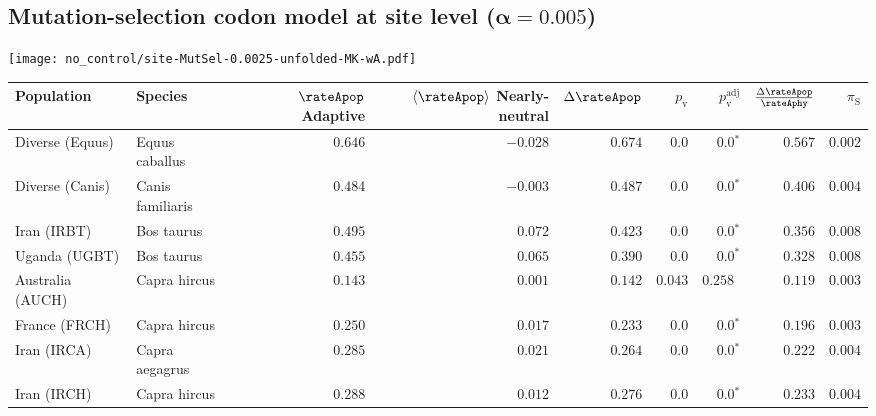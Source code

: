 \subsection{Mutation-selection codon model at site level ($\bm{\alpha=0.005}$)}
\begin{center}
    \texttt{[image: no\_control/site-MutSel-0.0025-unfolded-MK-wA.pdf]}
    \begin{adjustbox}{width = 1\textwidth}
        \begin{tabular}{|l|l|r|r|r|r|r|r|r|}
            \toprule
            Population & Species & \specialcell{$\rateApop$ \\ Adaptive}                & \specialcell{$\left< \rateApop \right>$ \\ Nearly-neutral}                & $\Delta \rateApop $    & $p_{\mathrm{v}}$ & $p_{\mathrm{v}}^{\mathrm{adj}}$   & $\frac{\Delta\rateApop}{\rateAphy}$ & $\pi_{\textrm{S}}$    \\
            \midrule
            Diverse (Equus)                    & Equus caballus          & $ 0.646$ & $-0.028$   & $ 0.674$ & $0.0$    & $\bm{0.0{^*}}$ & $ 0.567$ & $ 0.002$ \\
            Diverse (Canis)                  & Canis familiaris          & $ 0.484$ & $-0.003$   & $ 0.487$ & $0.0$    & $\bm{0.0{^*}}$ & $ 0.406$ & $ 0.004$ \\
            Iran (IRBT)               & Bos taurus        & $ 0.495$ & $ 0.072$   & $ 0.423$ & $0.0$ & $\bm{0.0{^*}}$     & $ 0.356$ & $ 0.008$ \\
            Uganda (UGBT)                  & Bos taurus        & $ 0.455$ & $ 0.065$   & $ 0.390$ & $0.0$    & $\bm{0.0{^*}}$ & $ 0.328$ & $ 0.008$ \\
            Australia (AUCH)                    & Capra hircus      & $ 0.143$ & $ 0.001$   & $ 0.142$ & $ 0.043$    & $ 0.258~~$ & $ 0.119$ & $ 0.003$ \\
            France (FRCH)                    & Capra hircus        & $ 0.250$ & $ 0.017$   & $ 0.233$ & $0.0$    & $\bm{0.0{^*}}$ & $ 0.196$ & $ 0.003$ \\
            Iran (IRCA)                   & Capra aegagrus        & $ 0.285$ & $ 0.021$   & $ 0.264$ & $0.0$    & $\bm{0.0{^*}}$ & $ 0.222$ & $ 0.004$ \\
            Iran (IRCH)                 & Capra hircus        & $ 0.288$ & $ 0.012$   & $ 0.276$ & $0.0$    & $\bm{0.0{^*}}$ & $ 0.233$ & $ 0.004$ \\

\end{tabular}
\end{adjustbox}
\end{center}
